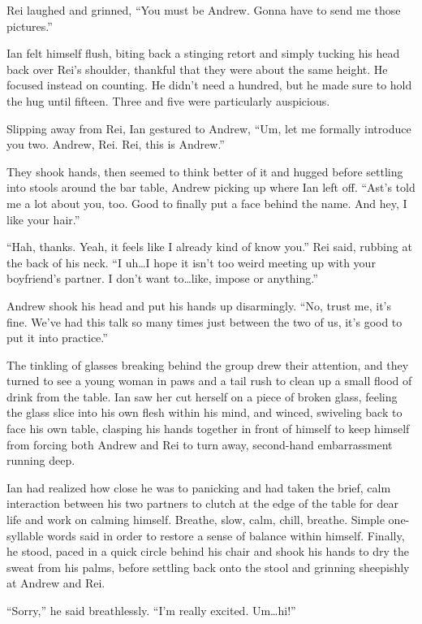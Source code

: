 Rei laughed and grinned, ``You must be Andrew. Gonna have to send me those pictures.''

Ian felt himself flush, biting back a stinging retort and simply tucking his head back over Rei's shoulder, thankful that they were about the same height. He focused instead on counting. He didn't need a hundred, but he made sure to hold the hug until fifteen. Three and five were particularly auspicious.

Slipping away from Rei, Ian gestured to Andrew, ``Um, let me formally introduce you two. Andrew, Rei. Rei, this is Andrew.''

They shook hands, then seemed to think better of it and hugged before settling into stools around the bar table, Andrew picking up where Ian left off. ``Ast's told me a lot about you, too. Good to finally put a face behind the name.  And hey, I like your hair.''

``Hah, thanks. Yeah, it feels like I already kind of know you.'' Rei said, rubbing at the back of his neck.  ``I uh\ldots{}I hope it isn't too weird meeting up with your boyfriend's partner. I don't want to\ldots{}like, impose or anything.''

Andrew shook his head and put his hands up disarmingly. ``No, trust me, it's fine. We've had this talk so many times just between the two of us, it's good to put it into practice.''

The tinkling of glasses breaking behind the group drew their attention, and they turned to see a young woman in paws and a tail rush to clean up a small flood of drink from the table. Ian saw her cut herself on a piece of broken glass, feeling the glass slice into his own flesh within his mind, and winced, swiveling back to face his own table, clasping his hands together in front of himself to keep himself from forcing both Andrew and Rei to turn away, second-hand embarrassment running deep.

Ian had realized how close he was to panicking and had taken the brief, calm interaction between his two partners to clutch at the edge of the table for dear life and work on calming himself. Breathe, slow, calm, chill, breathe. Simple one-syllable words said in order to restore a sense of balance within himself. Finally, he stood, paced in a quick circle behind his chair and shook his hands to dry the sweat from his palms, before settling back onto the stool and grinning sheepishly at Andrew and Rei.

``Sorry,'' he said breathlessly. ``I'm really excited. Um\ldots{}hi!''

